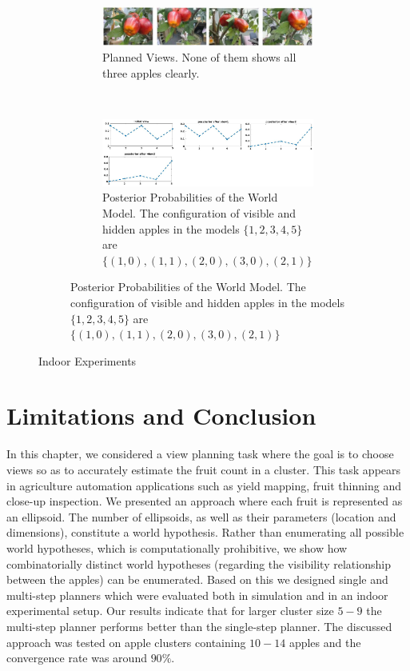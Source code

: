 \begin{figure}[!htbp]
\begin{subfigure}[b]{.58\textwidth}
    \begin{subfigure}[b]{\textwidth}
        \includegraphics[width=\textwidth]{figures/active_counting/realexppics.jpg}
    \caption{Planned Views. None of them shows all three apples clearly.}
    \label{fig:indoorviews}
    \end{subfigure}\\
    \begin{subfigure}[b]{\textwidth}
        \includegraphics[width=\textwidth]{figures/active_counting/realexppost2.jpg}
    \caption{Posterior Probabilities of the World Model. The configuration of visible and hidden apples in the models $\{1,2,3,4,5\}$ are $\{(1,0),(1,1),(2,0),(3,0),(2,1)\}$}
    \label{fig:indoorposterior}
    \end{subfigure}
\end{subfigure}
\caption[Indoor Experiments]{ Indoor Experiments}
\label{fig:indoorexp}
\end{figure}


\section{Limitations and Conclusion}

In this chapter, we considered a view planning task where the goal is to choose views so as to accurately estimate the fruit count in a cluster. This task appears in agriculture automation applications such as yield mapping, fruit thinning and close-up inspection. We presented an approach where each fruit is represented as an ellipsoid. The number of ellipsoids, as well as their parameters (location and dimensions), constitute a world hypothesis. Rather than enumerating all possible world hypotheses, which is computationally prohibitive, we show how combinatorially distinct world hypotheses (regarding the visibility relationship between the apples) can be enumerated. Based on this we designed single and multi-step planners which were evaluated both in simulation and in an indoor experimental setup. Our results indicate that for larger cluster size $5-9$ the multi-step planner performs better than the single-step planner. The discussed approach was tested on apple clusters containing $10-14$ apples and the convergence rate was around $90\%$. 

